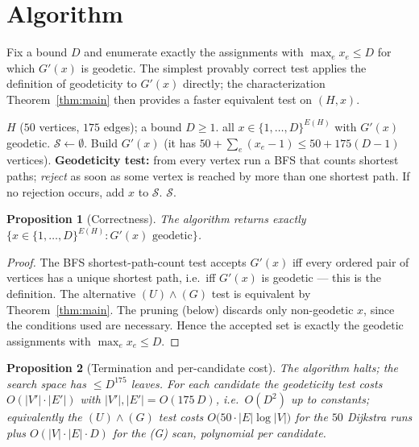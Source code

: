 \documentclass{amsart}
\newtheorem{proposition}{Proposition}
\theoremstyle{definition}
\begin{document}
\section{Algorithm}

Fix a bound $D$ and enumerate exactly the assignments with $\max_e x_e\le D$
for which $G'(x)$ is geodetic. The simplest provably correct test applies the
definition of geodeticity to $G'(x)$ directly; the characterization
Theorem~\ref{thm:main} then provides a faster equivalent test on $(H,x)$.

\begin{algorithm}[H]
\caption{Enumerate geodetic homeomorphs of $H$ with $\max_e x_e\le D$}
\begin{algorithmic}[1]
\Require $H$ ($50$ vertices, $175$ edges); a bound $D\ge1$.
\Ensure all $x\in\{1,\dots,D\}^{E(H)}$ with $G'(x)$ geodetic.
\State $\mathcal S\gets\emptyset$.
  \State Build $G'(x)$ (it has $50+\sum_e(x_e-1)\le 50+175(D-1)$ vertices).
  \State \textbf{Geodeticity test:} from every vertex run a BFS that counts
  shortest paths; \emph{reject} as soon as some vertex is reached by more than
  one shortest path. 
  \State If no rejection occurs, add $x$ to $\mathcal S$.
\EndFor
\State \Return $\mathcal S$.
\end{algorithmic}
\end{algorithm}

\begin{proposition}[Correctness]
The algorithm returns exactly $\{x\in\{1,\dots,D\}^{E(H)}:G'(x)\text{ geodetic}\}$.
\end{proposition}
\begin{proof}
The BFS shortest-path-count test accepts $G'(x)$ iff every ordered pair of
vertices has a unique shortest path, i.e.\ iff $G'(x)$ is geodetic --- this is
the definition. The alternative $(U)\wedge(G)$ test is equivalent by
Theorem~\ref{thm:main}. The pruning (below) discards only non-geodetic $x$, since
the conditions used are necessary. Hence the accepted set is exactly the geodetic
assignments with $\max_e x_e\le D$.
\end{proof}

\begin{proposition}[Termination and per-candidate cost]
The algorithm halts; the search space has $\le D^{175}$ leaves. For each
candidate the geodeticity test costs $O(|V'|\cdot|E'|)$ with
$|V'|,|E'|=O(175\,D)$, i.e.\ $O(D^{2})$ up to constants; equivalently the
$(U)\wedge(G)$ test costs $O\!\big(50\cdot|E|\log|V|\big)$ for the $50$ Dijkstra
runs plus $O(|V|\cdot|E|\cdot D)$ for the (G) scan, polynomial per candidate.
\end{proposition}
\end{document}
